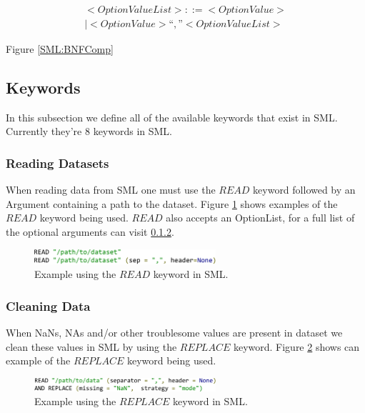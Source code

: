 \documentclass[jair,twoside,11pt,theapa]{article}
\begin{document}
\begin{equation} \label{BNF:OptionValueList}
\begin{split}
<Option Value List> ::= <Option Value> \\
| <Option Value> “,” <Option Value List>
\end{split}
\end{equation}

Figure \ref{SML:BNFComp} %

\subsection{Keywords}
In this subsection we define all of the available keywords that exist in SML. Currently they're 8 keywords in SML.

\subsubsection{Reading Datasets}
When reading data from SML one must use the \(READ\) keyword followed by an Argument containing a path to the dataset. Figure \ref{fig:SML:READ} shows examples of the \(READ\) keyword being used. \(READ\) also accepts an OptionList, for a full list of the optional arguments can visit \ref{}.

\begin{figure}
\includegraphics[width=0.6\textwidth]{figs/READ.png}
\centering
\caption{Example using the \(READ\) keyword in SML.}
\label{fig:SML:READ}
\end{figure}

\subsubsection{Cleaning Data}
When NaNs, NAs and/or other troublesome values are present in dataset we clean these values in SML by using the \(REPLACE\) keyword. Figure \ref{fig:SML:REPLACE} shows can example of the \(REPLACE\) keyword being used.  

\begin{figure}
\includegraphics[width=0.6\textwidth]{figs/REPLACE.png}
\centering
\caption{Example using the \(REPLACE\) keyword in SML.}
\label{fig:SML:REPLACE}
\end{figure}
\end{document}
